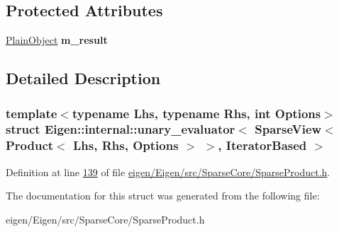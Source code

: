 \subsection*{Protected Attributes}
\begin{DoxyCompactItemize}
\item 
\mbox{\label{struct_eigen_1_1internal_1_1unary__evaluator_3_01_sparse_view_3_01_product_3_01_lhs_00_01_rhs_00009027121becdbd7ae7cc0d8a4c63ed7_ad5fce295f56e535fc51a841ea7c7bf0d}} 
\hyperlink{group___sparse_core___module_class_eigen_1_1_sparse_matrix}{Plain\+Object} {\bfseries m\+\_\+result}
\end{DoxyCompactItemize}


\subsection{Detailed Description}
\subsubsection*{template$<$typename Lhs, typename Rhs, int Options$>$\newline
struct Eigen\+::internal\+::unary\+\_\+evaluator$<$ Sparse\+View$<$ Product$<$ Lhs, Rhs, Options $>$ $>$, Iterator\+Based $>$}



Definition at line \hyperlink{eigen_2_eigen_2src_2_sparse_core_2_sparse_product_8h_source_l00139}{139} of file \hyperlink{eigen_2_eigen_2src_2_sparse_core_2_sparse_product_8h_source}{eigen/\+Eigen/src/\+Sparse\+Core/\+Sparse\+Product.\+h}.



The documentation for this struct was generated from the following file\+:\begin{DoxyCompactItemize}
\item 
eigen/\+Eigen/src/\+Sparse\+Core/\+Sparse\+Product.\+h\end{DoxyCompactItemize}
